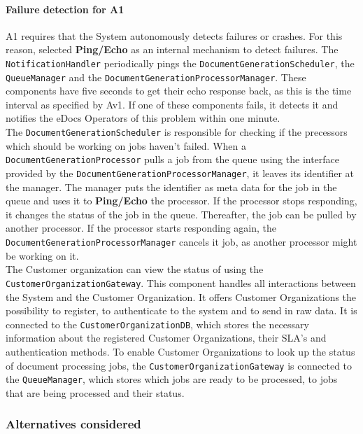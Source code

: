 \documentclass[a4paper,10pt]{article}
\begin{document}
\paragraph{Failure detection for A1}
A1 requires that the System autonomously detects failures or crashes. For this reason, selected \textbf{Ping/Echo} as an internal mechanism to detect failures. The \texttt{NotificationHandler} periodically pings the \texttt{DocumentGenerationScheduler}, the \texttt{QueueManager} and the \texttt{DocumentGenerationProcessorManager}. These components have five seconds to get their echo response back, as this is the time interval as specified by Av1. If one of these components fails, it detects it and notifies the eDocs Operators of this problem within one minute.\\
The \texttt{DocumentGenerationScheduler} is responsible for checking if the precessors which should be working on jobs haven't failed. When a \texttt{DocumentGenerationProcessor} pulls a job from the queue using the interface provided by the \texttt{DocumentGenerationProcessorManager}, it leaves its identifier at the manager. The manager puts the identifier as meta data for the job in the queue and uses it to \textbf{Ping/Echo} the processor. If the processor stops responding, it changes the status of the job in the queue. Thereafter, the job can be pulled by another processor. If the processor starts responding again, the \texttt{DocumentGenerationProcessorManager} cancels it job, as another processor might be working on it.\\
The Customer organization can view the status of using the \texttt{CustomerOrganizationGateway}. This component handles all interactions between the System and the Customer Organization. It offers Customer Organizations the possibility to register, to authenticate to the system and to send in raw data. It is connected to the \texttt{CustomerOrganizationDB}, which stores the necessary information about the registered Customer Organizations, their SLA's and authentication methods. To enable Customer Organizations to look up the status of document processing jobs, the \texttt{CustomerOrganizationGateway} is connected to the \texttt{QueueManager}, which stores which jobs are ready to be processed, to jobs that are being processed and their status.

\subsubsection*{Alternatives considered}
\end{document}
